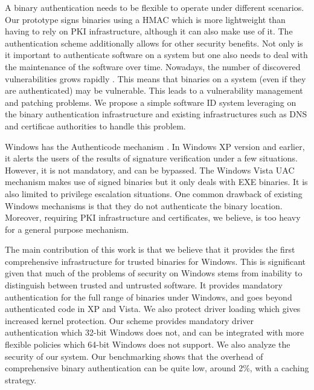 A binary authentication needs to be flexible to operate under different scenarios.
Our prototype signs binaries using a HMAC \cite{krawczyk1997rfc2104} which is more lightweight
than having to rely on PKI infrastructure, although it can also make use of it.
The authentication scheme additionally allows for other security benefits.
Not only is it important to authenticate software on a system but one also needs
to deal with the maintenance of the software over time.
Nowadays, the number of discovered vulnerabilities grows rapidly 
\cite{CERT-vul}.
This means that binaries on a system (even if they are authenticated) may
be vulnerable. This leads to a vulnerability management and patching problems.
We propose a simple software ID system leveraging on the binary
authentication infrastructure and existing infrastructures such as DNS and certificae authorities
to handle this problem.

Windows has the Authenticode mechanism \cite{authenticode}.
In Windows XP version and earlier, 
it alerts the users of the results of signature verification under
a few situations. However, it is not mandatory, and can be bypassed.
The Windows Vista UAC mechanism makes use of signed binaries but it only
deals with EXE binaries. It is also limited to privilege escalation situations.
One common drawback of existing Windows mechanisms is that they do not 
authenticate the binary location.
Moreover, requiring PKI infrastructure and certificates, 
we believe, is too heavy for a general purpose mechanism.

The main contribution of this work is that we believe that it provides the first
comprehensive infrastructure for trusted binaries for Windows.
This is significant given that much of the problems of security on Windows stems from
inability to distinguish between trusted and untrusted software.
It provides mandatory authentication for the full range of binaries under Windows, and goes beyond
authenticated code in XP and Vista.
We also protect driver loading which gives increased kernel protection.
Our scheme provides mandatory driver authentication which 32-bit Windows does not,
and can be integrated with more flexible policies which 64-bit Windows does not support.
We also analyze the security of our system. 
Our benchmarking shows that the overhead of comprehensive binary
authentication can be quite low, around 2\%,
with a caching strategy.


